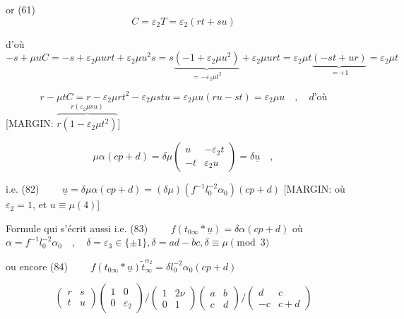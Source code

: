 \begin{enumerate}
or (61)
$$
C = \varepsilon_2 T = \varepsilon_2 (rt+su)
$$

d'où
$$
-s + \mu u C = -s + \varepsilon_2 \mu u r t + \varepsilon_2 \mu u^2 s = s \underbrace{(-1 + \varepsilon_2 \mu u^2)}_{= -\varepsilon_2 \mu t^2} + \varepsilon_2 \mu u r t = \varepsilon_2 \mu t \underbrace{(-st + ur)}_{= +1} = \varepsilon_2 \mu t
$$

\newpage


$$r - \mu t C = r - \varepsilon_2 \mu r t^2 - \varepsilon_2 \mu s t u = \varepsilon_2 \mu u (ru-st) = \varepsilon_2 \mu u \quad , \quad d\text{'où}$$
[MARGIN: $\overbrace{r(1-\varepsilon_2 \mu t^2)}^{r(\varepsilon_2 \mu s u)}$]

$$ \mu \alpha(cp+d) = \delta \mu \begin{pmatrix} u & -\varepsilon_2 t \\ -t & \varepsilon_2 u \end{pmatrix} = \delta \underline{u} \quad , $$

i.e.
(82) $\qquad \underline{u} = \delta \mu \alpha(cp+d) = (\delta \mu) (f^{-1} l_0^{-2} \alpha_0) (cp+d)$ [MARGIN: où $\varepsilon_2=1$, et $u \equiv \mu (4)$]

Formule qui s'écrit aussi
i.e.
(83) $\qquad f (t_{0\infty} * \underline{u}) = \delta \alpha (cp+d)$
où $\alpha = f^{-1} l_0^{-2} \alpha_0 \quad , \quad \delta = \varepsilon_3 \in \{\pm 1\}, \delta = ad-bc, \delta \equiv \mu \pmod 3$

ou encore
(84) $\qquad f (t_{0 \infty} * \underline{u}) \tilde{t}_{\infty}^{\alpha_2} = \delta l_0^{-2} \alpha_0 (cp+d)$

$$ \begin{pmatrix} r & s \\ t & u \end{pmatrix} \begin{pmatrix} 1 & 0 \\ 0 & \varepsilon_2 \end{pmatrix} \bigg/ \begin{pmatrix} 1 & 2\nu \\ 0 & 1 \end{pmatrix} \begin{pmatrix} a & b \\ c & d \end{pmatrix} \bigg/ \begin{pmatrix} d & c \\ -c & c+d \end{pmatrix} $$


\end{enumerate}
